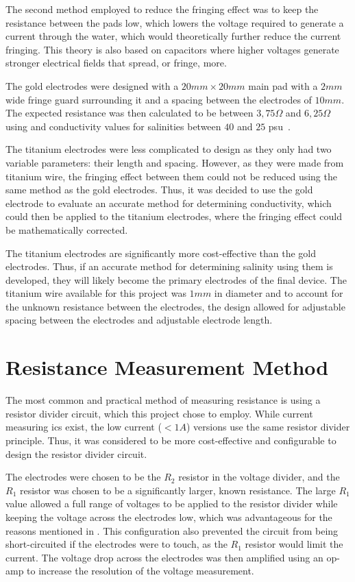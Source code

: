 The second method employed to reduce the fringing effect was to keep the resistance between the pads low, which lowers the voltage required to generate a current through the water, which would theoretically further reduce the current fringing.
This theory is also based on capacitors where higher voltages generate stronger electrical fields that spread, or fringe, more.

The gold electrodes were designed with a $20mm \times 20mm$ main pad with a $2mm$ wide fringe guard surrounding it and a spacing between the electrodes of $10mm$.
The expected resistance was then calculated to be between $3,75\Omega$ and $6,25\Omega$ using  and conductivity values for salinities between $40$ and $25$ \gls{psu}~\cite{ioc_teos_2010}.

The titanium electrodes were less complicated to design as they only had two variable parameters: their length and spacing.
However, as they were made from titanium wire, the fringing effect between them could not be reduced using the same method as the gold electrodes.
Thus, it was decided to use the gold electrode to evaluate an accurate method for determining conductivity, which could then be applied to the titanium electrodes, where the fringing effect could be mathematically corrected.

The titanium electrodes are significantly more cost-effective than the gold electrodes. 
Thus, if an accurate method for determining salinity using them is developed, they will likely become the primary electrodes of the final device.  
The titanium wire available for this project was $1mm$ in diameter and to account for the unknown resistance between the electrodes, the design allowed for adjustable spacing between the electrodes and adjustable electrode length.

\section{Resistance Measurement Method}

The most common and practical method of measuring resistance is using a resistor divider circuit, which this project chose to employ. 
While current measuring \glspl{ic} exist, the low current ($<1A$) versions use the same resistor divider principle. 
Thus, it was considered to be more cost-effective and configurable to design the resistor divider circuit.

The electrodes were chosen to be the $R_2$ resistor in the voltage divider, and the $R_1$ resistor was chosen to be a significantly larger, known resistance.
The large $R_1$ value allowed a full range of voltages to be applied to the resistor divider while keeping the voltage across the electrodes low, which was advantageous for the reasons mentioned in .
This configuration also prevented the circuit from being short-circuited if the electrodes were to touch, as the $R_1$ resistor would limit the current.
The voltage drop across the electrodes was then amplified using an op-amp to increase the resolution of the voltage measurement.

